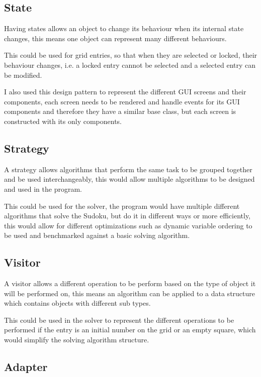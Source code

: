 \documentclass[]{final_report}
\begin{document}
\subsection*{State}

Having states allows an object to change its behaviour when its internal state changes, this means one object can represent many different behaviours.

This could be used for grid entries, so that when they are selected or locked, their behaviour changes, i.e. a locked entry cannot be selected and a selected entry can be modified.

I also used this design pattern to represent the different GUI screens and their components, each screen needs to be rendered and handle events for its GUI components and therefore they have a similar base class, but each screen is constructed with its only components.

\subsection*{Strategy}

A strategy allows algorithms that perform the same task to be grouped together and be used interchangeably, this would allow multiple algorithms to be designed and used in the program.

This could be used for the solver, the program would have multiple different algorithms that solve the Sudoku, but do it in different ways or more efficiently, this would allow for different optimizations such as dynamic variable ordering to be used and benchmarked against a basic solving algorithm.

\subsection*{Visitor}

A visitor allows a different operation to be perform based on the type of object it will be performed on, this means an algorithm can be applied to a data structure which contains objects with different sub types.

This could be used in the solver to represent the different operations to be performed if the entry is an initial number on the grid or an empty square, which would simplify the solving algorithm structure.

\subsection*{Adapter}
\end{document}

